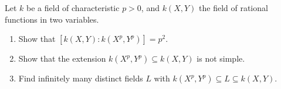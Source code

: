 \begin{problem}
  Let \(k\) be a field of characteristic \(p>0\), and \(k(X,Y)\) the field
  of rational functions in two variables.
\begin{enumerate}[label=(\alph*)]
\item Show that \(\left[k(X,Y):k(X^p,Y^p)\right]=p^2\).
\item Show that the extension \(k(X^p,Y^p)\subseteq k(X,Y)\) is not simple.
\item Find infinitely many distinct fields \(L\) with
  \(k(X^p,Y^p)\subseteq L\subseteq k(X,Y)\).
\end{enumerate}
\end{problem}
\begin{solution}
\end{solution}

